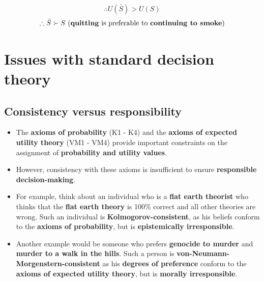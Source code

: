 \documentclass[11pt]{article}
\begin{document}
\[\therefore U(\bar{S}) > U(S)\]
\[\therefore \bar{S} \succ S \ \text{(\textbf{quitting} is preferable to \textbf{continuing to smoke})}\]

 \newpage
\section{Issues with standard decision theory}
\label{sec:orge21c1ba}

\subsection{Consistency versus responsibility}
\label{sec:org8a67fda}
\begin{itemize}
\item The \textbf{axioms of probability} (K1 - K4) and the \textbf{axioms of expected utility theory} (VM1 - VM4) provide important constraints on the assignment of \textbf{probability and utility values}.
\item However, consistency with these axioms is insufficient to ensure \textbf{responsible decision-making}.
\item For example, think about an individual who is a \textbf{flat earth theorist} who thinks that the \textbf{flat earth theory} is 100\% correct and all other theories are wrong. Such an individual is \textbf{Kolmogorov-consistent}, as his beliefs conform to the \textbf{axioms of probability}, but is \textbf{epistemically irresponsible}.
\item Another example would be someone who prefers \textbf{genocide to murder} and \textbf{murder to a walk in the hills}. Such a person is \textbf{von-Neumann-Morgenstern-consistent} as his \textbf{degrees of preference} conform to the \textbf{axioms of expected utility theory}, but is \textbf{morally irresponsible}.
\end{itemize}
\end{document}
